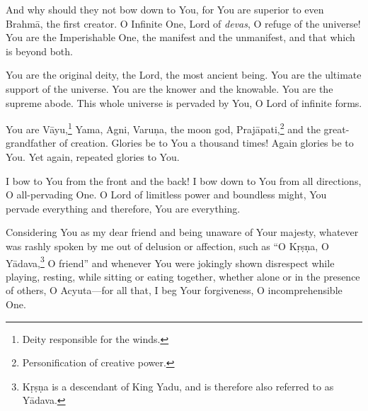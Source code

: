 {And why should they not bow down to You, for You are superior to even Brahmā, the first creator. O Infinite One, Lord of \textit{devas}, O refuge of the universe! You are the Imperishable One, the manifest and the unmanifest, and that which is beyond both.}

{You are the original deity, the Lord, the most ancient being. You are the ultimate support of the universe. You are the knower and the knowable. You are the supreme abode. This whole universe is pervaded by You, O Lord of infinite forms.}

{You are Vāyu,\footnote{Deity responsible for the winds.} Yama, Agni, Varuṇa, the moon god, Prajāpati,\footnote{Personification of creative power.} and the great-grandfather of creation. Glories be to You a thousand times! Again glories be to You. Yet again, repeated glories to You.}

{I bow to You from the front and the back! I bow down to You from all directions, O all-pervading One. O Lord of limitless power and boundless might, You pervade everything and therefore, You are everything.}

{Considering You as my dear friend and being unaware of Your majesty, whatever was rashly spoken by me out of delusion or affection, such as \enquote{O Kṛṣṇa, O Yādava,\footnote{Kṛṣṇa is a descendant of King Yadu, and is therefore also referred to as Yādava.} O friend}  and whenever You were jokingly shown disrespect while playing, resting, while sitting or eating together, whether alone or in the presence of others, O Acyuta---for all that, I beg Your forgiveness, O incomprehensible One.}

